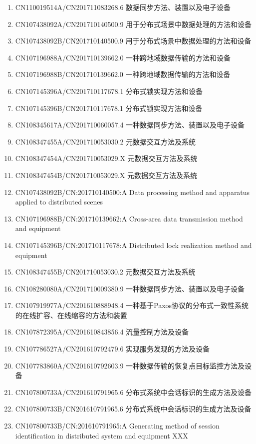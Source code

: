 \documentclass[scheme=plain]{ctexart}
\begin{document}
\begin{enumerate}
    \item CN110019514A/CN201711083268.6 数据同步方法、装置以及电子设备
    \item CN107438092A/CN201710140500.9 用于分布式场景中数据处理的方法和设备
    \item CN107438092B/CN201710140500.9 用于分布式场景中数据处理的方法和设备
    \item CN107196988A/CN201710139662.0 一种跨地域数据传输的方法和设备
    \item CN107196988B/CN201710139662.0 一种跨地域数据传输的方法和设备
    \item CN107145396A/CN201710117678.1 分布式锁实现方法和设备
    \item CN107145396B/CN201710117678.1 分布式锁实现方法和设备
    \item CN108345617A/CN201710060057.4 一种数据同步方法、装置以及电子设备
    \item CN108347455A/CN201710053030.2 元数据交互方法及系统
    \item CN108347454A/CN201710053029.X 元数据交互方法及系统
    \item CN108347454B/CN201710053029.X 元数据交互方法及系统
    \item CN107438092B/CN:201710140500:A Data processing method and apparatus applied to distributed scenes
    \item CN107196988B/CN:201710139662:A Cross-area data transmission method and equipment
    \item CN107145396B/CN:201710117678:A Distributed lock realization method and equipment
    \item CN108347455B/CN201710053030.2 元数据交互方法及系统
    \item CN108280080A/CN201710009380.9 一种数据同步方法、装置以及电子设备
    \item CN107919977A/CN201610888948.4 一种基于Paxos协议的分布式一致性系统的在线扩容、在线缩容的方法和装置
    \item CN107872395A/CN201610843856.4 流量控制方法及设备
    \item CN107786527A/CN201610792479.6 实现服务发现的方法及设备
    \item CN107783860A/CN201610792603.9 一种数据传输的恢复点目标监控方法及设备
    \item CN107800733A/CN201610791965.6 分布式系统中会话标识的生成方法及设备
    \item CN107800733B/CN201610791965.6 分布式系统中会话标识的生成方法及设备
    \item CN107800733B/CN:201610791965:A Generating method of session identification in distributed system and equipment XXX

\end{enumerate}
\end{document}
